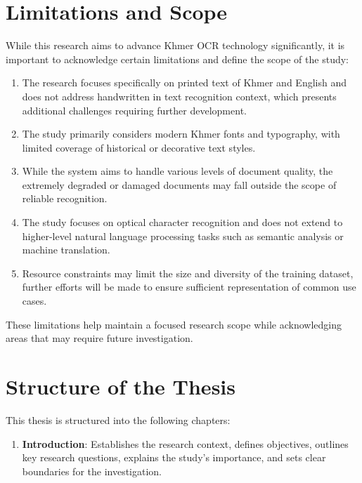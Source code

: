 {\section{Limitations and Scope}
\label{sec:limitations}

While this research aims to advance Khmer OCR technology significantly, it is important to acknowledge certain limitations and define the scope of the study:

\begin{enumerate}
    \item The research focuses specifically on printed text of Khmer and English and does not address handwritten in text recognition context, which presents additional challenges requiring further development.
    
    \item The study primarily considers modern Khmer fonts and typography, with limited coverage of historical or decorative text styles.
    
    \item While the system aims to handle various levels of document quality, the extremely degraded or damaged documents may fall outside the scope of reliable recognition.
    
    \item The study focuses on optical character recognition and does not extend to higher-level natural language processing tasks such as semantic analysis or machine translation.
    
    \item Resource constraints may limit the size and diversity of the training dataset, further efforts will be made to ensure sufficient representation of common use cases.
\end{enumerate}

These limitations help maintain a focused research scope while acknowledging areas that may require future investigation.

\section{Structure of the Thesis}
\label{sec:structure}

This thesis is structured into the following chapters:

\begin{enumerate}
   \item \textbf{Introduction}: Establishes the research context, defines objectives, outlines key research questions, explains the study's importance, and sets clear boundaries for the investigation.
   

\end{enumerate}}
